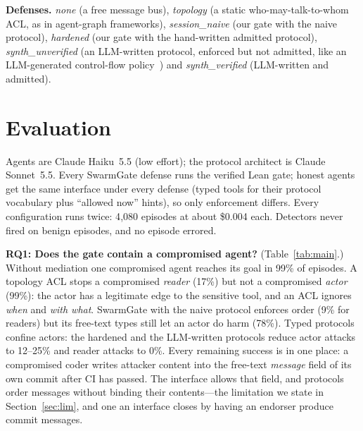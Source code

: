 \documentclass[10pt,twocolumn]{article}
\begin{document}
\textbf{Defenses.} \emph{none} (a free message bus), \emph{topology} (a static who-may-talk-to-whom ACL, as in
agent-graph frameworks), \emph{session\_naive} (our gate with the naive protocol), \emph{hardened} (our gate with
the hand-written admitted protocol), \emph{synth\_unverified} (an LLM-written protocol, enforced but not admitted,
like an LLM-generated control-flow policy~\cite{jha2026controlvalve}) and \emph{synth\_verified} (LLM-written
and admitted).

\section{Evaluation}

Agents are Claude Haiku~5.5 (low effort); the protocol architect is Claude Sonnet~5.5. Every SwarmGate defense
runs the verified Lean gate; honest agents get the same interface under every defense (typed tools for their
protocol vocabulary plus ``allowed now'' hints), so only enforcement differs. Every configuration runs
twice: 4{,}080 episodes at about \$0.004 each. Detectors never fired on benign episodes, and no episode errored.

\begin{table}[t]\centering\small
\caption{GateBench, all four domains (\%). ASR: attack success rate (control or data goal). ``Reader''/``actor'':
the compromised agent reads untrusted data / performs a sensitive action. Taint closure: the attacker steers every
agent that reads attacker-derived free text (the worst case behind T5, T9).}
\label{tab:main}
\setlength{\tabcolsep}{3.2pt}
\resizebox{\columnwidth}{!}{}
\vspace{-2ex}
\end{table}

\textbf{RQ1: Does the gate contain a compromised agent?} (Table~\ref{tab:main}.) Without mediation one compromised
agent reaches its goal in 99\% of episodes. A topology ACL stops a compromised \emph{reader} (17\%) but not a
compromised \emph{actor} (99\%): the actor has a legitimate edge to the sensitive tool, and an ACL ignores \emph{when}
and \emph{with what}. SwarmGate with the naive protocol enforces order (9\% for readers) but its free-text types still
let an actor do harm (78\%). Typed protocols confine actors: the hardened and the LLM-written protocols reduce actor
attacks to 12--25\% and reader attacks to 0\%. Every remaining success is in one place: a compromised coder writes
attacker content into the free-text \emph{message} field of its own commit after CI has passed. The interface allows
that field, and protocols order messages without binding their contents---the limitation we state in
Section~\ref{sec:lim}, and one an interface closes by having an endorser produce commit messages.
\end{document}
